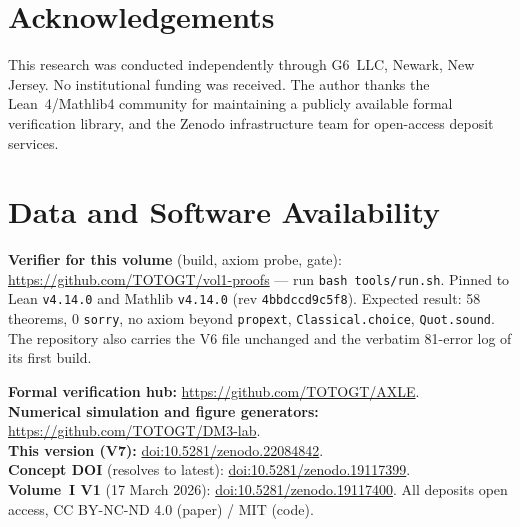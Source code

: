 \documentclass[14pt,a4paper]{extarticle}
\begin{document}
\section*{Acknowledgements}

This research was conducted independently through G6~LLC,
Newark, New Jersey.
No institutional funding was received.
The author thanks the Lean~4/Mathlib4 community for maintaining
a publicly available formal verification library, and the Zenodo
infrastructure team for open-access deposit services.

\section*{Data and Software Availability}

\begin{sloppypar}
\noindent
\textbf{Verifier for this volume} (build, axiom probe, gate):
\url{https://github.com/TOTOGT/vol1-proofs} --- run
\texttt{bash tools/run.sh}. Pinned to Lean \texttt{v4.14.0} and Mathlib
\texttt{v4.14.0} (rev \texttt{4bbdccd9c5f8}). Expected result: 58
theorems, 0 \texttt{sorry}, no axiom beyond \texttt{propext},
\texttt{Classical.choice}, \texttt{Quot.sound}. The repository also carries
the V6 file unchanged and the verbatim 81-error log of its first build.

\medskip
\noindent
\textbf{Formal verification hub:} \url{https://github.com/TOTOGT/AXLE}.\\
\textbf{Numerical simulation and figure generators:}
\url{https://github.com/TOTOGT/DM3-lab}.\\
\textbf{This version (V7):}
\href{https://doi.org/10.5281/zenodo.22084842}{doi:10.5281/zenodo.22084842}.\\
\textbf{Concept DOI} (resolves to latest):
\href{https://doi.org/10.5281/zenodo.19117399}{doi:10.5281/zenodo.19117399}.\\
\textbf{Volume~I V1} (17 March 2026):
\href{https://doi.org/10.5281/zenodo.19117400}{doi:10.5281/zenodo.19117400}.
All deposits open access, CC BY-NC-ND 4.0 (paper) / MIT (code).
\end{sloppypar}
\end{document}

